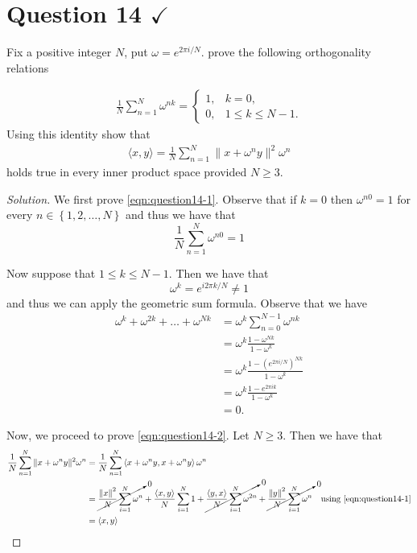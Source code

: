 \section{Question 14 \texorpdfstring{$\checkmark$}{}}
\horz
Fix a positive integer $N$, put $\omega= e ^{2\pi i/N}.$ prove the following orthogonality relations

\begin{align}
\frac{1}{N} \sum\limits_{n=1}^N\omega^{nk} = 
\begin{cases}
1, & k=0,\\
0, & 1\leqslant k \leqslant N-1.
\end{cases}
\label{eqn:question14-1}
\end{align}
Using this identity show that
\begin{align}
\langle x,y\rangle = \frac{1}{N} \sum\limits_{n=1}^N \|x+\omega^n y\|^2 \omega^n
\label{eqn:question14-2}
\end{align} holds true in every inner product space provided $N\geqslant 3.$
\horz
\begin{proof}[Solution]
    We first prove \ref{eqn:question14-1}. Observe that if $k=0$ then $\omega^{n0} =1$ for every $n \in \left\{ 1,2, \ldots , N \right\}$ and thus we have that 
    \begin{equation*}
	\frac{1}{N} \sum_{n=1}^{N} \omega^{n0} = 1
    \end{equation*}
    
    Now suppose that $1\le k \le N-1$. Then we have that
    \begin{equation*}
	\omega^{k} = e ^{i2\pi k / N} \ne 1
    \end{equation*}
and thus we can apply the geometric sum formula. Observe that we have
\begin{align*}
    \omega ^{k} + \omega ^{2k} + \ldots + \omega ^{ Nk } &= \omega^{k} \sum_{n=0}^{N-1} \omega ^{nk} \\
    &= \omega ^{k} \frac{1- \omega^{Nk}}{1-\omega^{k}} \\ 
    &= \omega ^{k} \frac{1- \left( e^{2\pi i /N} \right)^{Nk}}{1-\omega ^{k}} \\
    &= \omega ^{k} \frac{1- e^{2\pi i k}}{1-\omega ^{k}} \\
    &= 0\text{.}
\end{align*}

Now, we proceed to prove \ref{eqn:question14-2}. Let $N\ge 3$. Then we have that
\begin{align*}
\frac{1}{N} \sum\limits_{n=1}^N \|x+\omega^n y\|^2 \omega^n 
&=  \frac{1}{N} \sum\limits_{n=1}^N \left\langle x+\omega ^{n} y , x + \omega ^{n} y \right\rangle \omega^n \\
&= \cancelto{0}{\frac{\left\lVert x \right\rVert^{2}}{N} \sum_{i=1}^{N} \omega ^{n}} + \frac{\left\langle x,y \right\rangle}{N} \sum_{i=1}^{N} 1  + \cancelto{0}{\frac{\left\langle y,x \right\rangle}{N} \sum_{i=1}^{N} \omega^{2n}} + \cancelto{0}{\frac{\left\lVert y \right\rVert^{2}}{N} \sum_{i=1}^{N} \omega ^{n}} &  \text{using \ref{eqn:question14-1}} \\
& = \left\langle x,y \right\rangle
\end{align*}

\end{proof}
